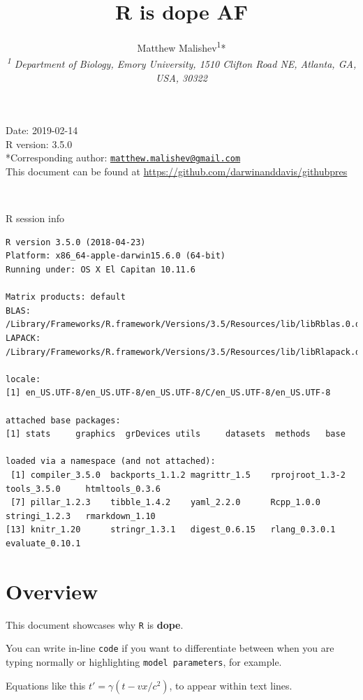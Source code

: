 \documentclass[10,portrait]{article}
\title{R is dope AF}
\author{Matthew
Malishev\textsuperscript{1}*\\[2\baselineskip]\emph{\textsuperscript{1}
Department of Biology, Emory University, 1510 Clifton Road NE, Atlanta,
GA, USA, 30322}}
\date{}
\begin{document}
\maketitle

{
\hypersetup{linkcolor=black}
\setcounter{tocdepth}{4}
\tableofcontents
}
\newpage   

Date: 2019-02-14\\
R version: 3.5.0\\
*Corresponding author:
\href{mailto:matthew.malishev@gmail.com}{\nolinkurl{matthew.malishev@gmail.com}}\\
This document can be found at
\url{https://github.com/darwinanddavis/githubpres}

~

R session info

\begin{verbatim}
R version 3.5.0 (2018-04-23)
Platform: x86_64-apple-darwin15.6.0 (64-bit)
Running under: OS X El Capitan 10.11.6

Matrix products: default
BLAS: /Library/Frameworks/R.framework/Versions/3.5/Resources/lib/libRblas.0.dylib
LAPACK: /Library/Frameworks/R.framework/Versions/3.5/Resources/lib/libRlapack.dylib

locale:
[1] en_US.UTF-8/en_US.UTF-8/en_US.UTF-8/C/en_US.UTF-8/en_US.UTF-8

attached base packages:
[1] stats     graphics  grDevices utils     datasets  methods   base     

loaded via a namespace (and not attached):
 [1] compiler_3.5.0  backports_1.1.2 magrittr_1.5    rprojroot_1.3-2 tools_3.5.0     htmltools_0.3.6
 [7] pillar_1.2.3    tibble_1.4.2    yaml_2.2.0      Rcpp_1.0.0      stringi_1.2.3   rmarkdown_1.10 
[13] knitr_1.20      stringr_1.3.1   digest_0.6.15   rlang_0.3.0.1   evaluate_0.10.1
\end{verbatim}

\newpage  

\section{Overview}\label{overview}

This document showcases why \texttt{R} is \textbf{dope}.

You can write in-line \texttt{code} if you want to differentiate between
when you are typing normally or highlighting \texttt{model\ parameters},
for example.

Equations like this \(t' = \gamma(t - vx/c^{2})\), to appear within text
lines.
\end{document}
